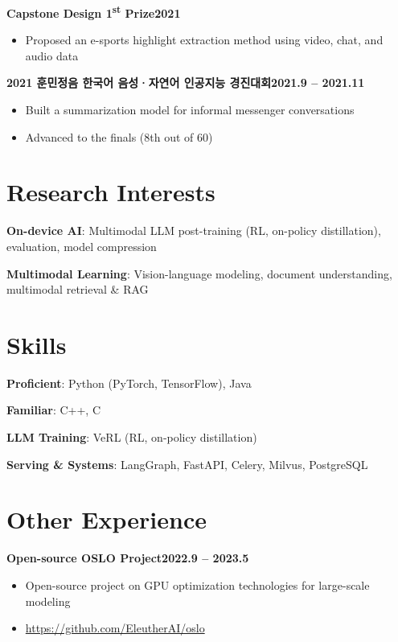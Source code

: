 \documentclass[10pt,a4paper]{article}
\newcommand{\entry}[2]{\par\noindent#1\hfill#2\par}
\newcommand{\titled}[2]{\par\vspace{3pt}\entry{\textbf{#1}}{\textbf{#2}}}
\begin{document}
\titled{Capstone Design 1\textsuperscript{st} Prize}{2021}
\begin{itemize}
  \item Proposed an e-sports highlight extraction method using video, chat, and audio data
\end{itemize}

\titled{2021 훈민정음 한국어 음성·자연어 인공지능 경진대회}{2021.9 -- 2021.11}
\begin{itemize}
  \item Built a summarization model for informal messenger conversations
  \item Advanced to the finals (8th out of 60)
\end{itemize}

\section{Research Interests}
\textbf{On-device AI}: Multimodal LLM post-training (RL, on-policy distillation), evaluation, model compression\par
\textbf{Multimodal Learning}: Vision-language modeling, document understanding, multimodal retrieval \& RAG\par

\section{Skills}
\textbf{Proficient}: Python (PyTorch, TensorFlow), Java\par
\textbf{Familiar}: C++, C\par
\textbf{LLM Training}: VeRL (RL, on-policy distillation)\par
\textbf{Serving \& Systems}: LangGraph, FastAPI, Celery, Milvus, PostgreSQL\par

\section{Other Experience}

\titled{Open-source OSLO Project}{2022.9 -- 2023.5}
\begin{itemize}
  \item Open-source project on GPU optimization technologies for large-scale modeling
  \item \url{https://github.com/EleutherAI/oslo}
\end{itemize}
\end{document}
